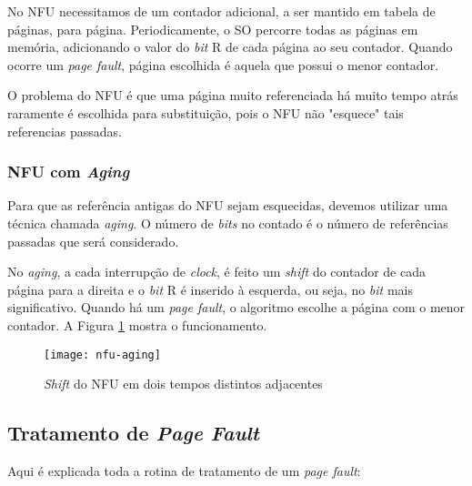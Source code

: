 No NFU necessitamos de um contador adicional, a ser mantido em tabela de páginas, para página. Periodicamente, o SO percorre todas as páginas em memória, adicionando o valor do \textit{bit} R de cada página ao seu contador. Quando ocorre um \textit{page fault}, página escolhida é aquela que possui o menor contador.

O problema do NFU é que uma página muito referenciada há muito tempo atrás raramente é escolhida para substituição, pois o NFU não "esquece" tais referencias passadas.


\subsubsection{NFU com \textit{Aging}}
Para que as referência antigas do NFU sejam esquecidas, devemos utilizar uma técnica chamada \textit{aging}. O número de \textit{bits} no contado é o número de referências passadas que será considerado.

No \textit{aging}, a cada interrupção de \textit{clock}, é feito um \textit{shift} do contador de cada página para a direita e o \textit{bit} R é inserido à esquerda, ou seja, no \textit{bit} mais significativo. Quando há um \textit{page fault}, o algoritmo escolhe a página com o menor contador. A Figura \ref{fig:nfu-aging} mostra o funcionamento.

\begin{figure}[h]
  \centering
  \texttt{[image: nfu-aging]}
  \caption{\textit{Shift} do NFU em dois tempos distintos adjacentes}
  \label{fig:nfu-aging}
\end{figure}




\subsection{Tratamento de \textit{Page Fault}}
\label{sec:page-fault}
Aqui é explicada toda a rotina de tratamento de um \textit{page fault}:

